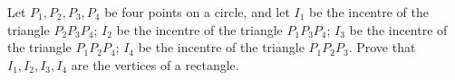 Let $P_1,P_2,P_3,P_4$ be four points on a circle, and let $I_1$ be the incentre of the triangle $P_2P_3P_4$; $I_2$ be the incentre of the triangle $P_1P_3P_4$; $I_3$ be the incentre of the triangle $P_1P_2P_4$; $I_4$ be the incentre of the triangle $P_1P_2P_3$. Prove that $I_1,I_2,I_3,I_4$ are the vertices of a rectangle.